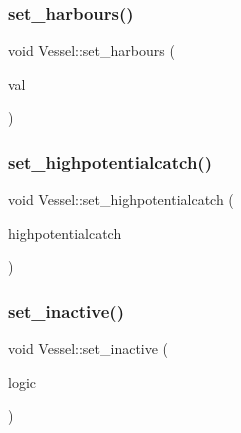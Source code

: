 \subsubsection{\texorpdfstring{set\_harbours()}{set\_harbours()}}
{\footnotesize\ttfamily void Vessel\+::set\+\_\+harbours (\begin{DoxyParamCaption}\item[{int}]{val }\end{DoxyParamCaption})}

\mbox{\label{class_vessel_aebdc1f709ffe4f34f89a610d1652888e}} 
\subsubsection{\texorpdfstring{set\_highpotentialcatch()}{set\_highpotentialcatch()}}
{\footnotesize\ttfamily void Vessel\+::set\+\_\+highpotentialcatch (\begin{DoxyParamCaption}\item[{\mbox{\hyperlink{classtypes_1_1_node_id}{types\+::\+Node\+Id}}}]{highpotentialcatch }\end{DoxyParamCaption})}

\mbox{\label{class_vessel_a9947163ccf008690f425605aa407f453}} 
\subsubsection{\texorpdfstring{set\_inactive()}{set\_inactive()}}
{\footnotesize\ttfamily void Vessel\+::set\+\_\+inactive (\begin{DoxyParamCaption}\item[{bool}]{logic }\end{DoxyParamCaption})}

\mbox{\label{class_vessel_a8f7bd71aa4502532e5537ba338140566}} 
